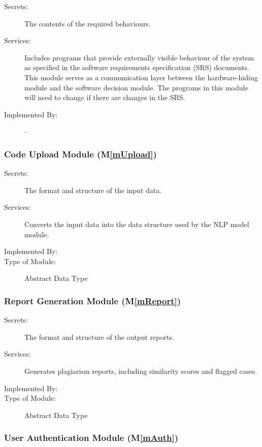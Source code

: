 \documentclass[12pt, titlepage]{article}
\newcommand{\mref}[1]{M\ref{#1}}
\begin{document}
\begin{description}
\item[Secrets:] The contents of the required behaviours.
\item[Services:] Includes programs that provide externally visible behaviour of
  the system as specified in the software requirements specification (SRS)
  documents. This module serves as a communication layer between the
  hardware-hiding module and the software decision module. The programs in this
  module will need to change if there are changes in the SRS.
\item[Implemented By:] --
\end{description}

\subsubsection{Code Upload Module (\mref{mUpload})}

\begin{description}
\item[Secrets:] The format and structure of the input data.
\item[Services:] Converts the input data into the data structure used by the
  NLP model module.
\item[Implemented By:] \progname{}
\item[Type of Module:] Abstract Data Type
\end{description}

\subsubsection{Report Generation Module (\mref{mReport})}

\begin{description}
\item[Secrets:] The format and structure of the output reports.
\item[Services:] Generates plagiarism reports, including similarity scores and flagged cases.
\item[Implemented By:] \progname{}
\item[Type of Module:] Abstract Data Type
\end{description}

\subsubsection{User Authentication Module (\mref{mAuth})}
\end{document}
